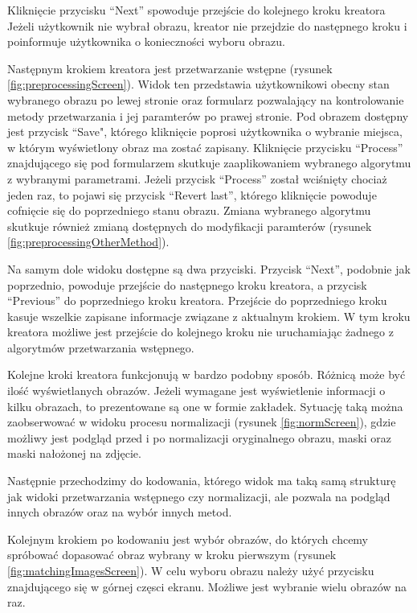 Kliknięcie przycisku ``Next'' spowoduje przejście do kolejnego kroku kreatora Jeżeli użytkownik
nie wybrał obrazu, kreator nie przejdzie do następnego kroku i poinformuje użytkownika o konieczności
wyboru obrazu.\newline

Następnym krokiem kreatora jest przetwarzanie wstępne (rysunek \ref{fig:preprocessingScreen}). Widok ten
przedstawia użytkownikowi obecny stan wybranego obrazu po lewej stronie oraz formularz pozwalający
na kontrolowanie metody przetwarzania i jej paramterów po prawej stronie. Pod obrazem dostępny jest
przycisk ``Save", którego kliknięcie poprosi użytkownika o wybranie miejsca, w którym wyświetlony obraz
ma zosta\'c zapisany. Kliknięcie przycisku ``Process'' znajdującego się pod formularzem skutkuje
zaaplikowaniem wybranego algorytmu z wybranymi parametrami. Jeżeli przycisk ``Process'' został wciśnięty
chociaż jeden raz, to pojawi się przycisk ``Revert last'', którego kliknięcie powoduje cofnięcie się
do poprzedniego stanu obrazu. Zmiana wybranego algorytmu skutkuje również zmianą dostępnych
do modyfikacji paramterów (rysunek \ref{fig:preprocessingOtherMethod}).

Na samym dole widoku dostępne są dwa przyciski. Przycisk ``Next'', podobnie
jak poprzednio, powoduje przejście do następnego kroku kreatora, a przycisk ``Previous'' do poprzedniego
kroku kreatora. Przejście do poprzedniego kroku kasuje wszelkie zapisane informacje związane z aktualnym
krokiem. W tym kroku kreatora możliwe jest przejście do kolejnego kroku nie uruchamiając żadnego z
algorytmów przetwarzania wstępnego.\newline

Kolejne kroki kreatora funkcjonują w bardzo podobny sposób. Różnicą może by\'c iloś\'c wyświetlanych
obrazów. Jeżeli wymagane jest wyświetlenie informacji o kilku obrazach, to prezentowane są one w formie
zakładek. Sytuację taką można zaobserwowa\'c w widoku procesu normalizacji (rysunek \ref{fig:normScreen}),
gdzie możliwy jest podgląd przed i po normalizacji oryginalnego obrazu, maski oraz maski nałożonej na
zdjęcie.\newline

Następnie przechodzimy do kodowania, którego widok ma taką samą strukturę jak widoki przetwarzania
wstępnego czy normalizacji, ale pozwala na podgląd innych obrazów oraz na wybór innych metod.\newline

Kolejnym krokiem po kodowaniu jest wybór obrazów, do których chcemy spróbowa\'c dopasowa\'c obraz
wybrany w kroku pierwszym (rysunek \ref{fig:matchingImagesScreen}). W celu wyboru obrazu należy
uży\'c przycisku znajdującego się w górnej częsci ekranu. Możliwe jest wybranie wielu obrazów na raz.\newline

